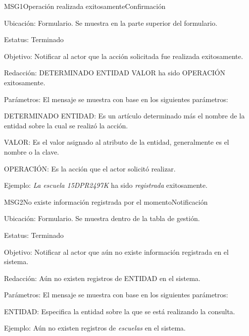 \begin{mensaje}{MSG1}{Operación realizada exitosamente}{Confirmación}
    \item[Ubicación:] Formulario. Se muestra en la parte superior del formulario.
    \item[Estatus:] Terminado
    \item[Objetivo:] Notificar al actor que la acción solicitada fue realizada exitosamente.
    \item[Redacción:] DETERMINADO ENTIDAD VALOR ha sido OPERACIÓN exitosamente.
    \item[Parámetros:] El mensaje se muestra con base en los siguientes parámetros:
    \begin{Citemize}
	\item DETERMINADO ENTIDAD: Es un artículo determinado más el nombre de la entidad sobre la cual se realizó la acción.
	\item VALOR: Es el valor asignado al atributo de la entidad, generalmente es el nombre o la clave.
	\item OPERACIÓN: Es la acción que el actor solicitó realizar.
    \end{Citemize}
    \item[Ejemplo:] {\em La escuela 15DPR2497K} ha sido {\em registrada} exitosamente.
\end{mensaje}

\begin{mensaje}{MSG2}{No existe información registrada por el momento}{Notificación}
    \item[Ubicación:] Formulario. Se muestra dentro de la tabla de gestión.
    \item[Estatus:] Terminado
    \item[Objetivo:] Notificar al actor que aún no existe información registrada en el sistema.
    \item[Redacción:] Aún no existen registros de ENTIDAD en el sistema.
    \item[Parámetros:] El mensaje se muestra con base en los siguientes parámetros:
    \begin{Citemize}
	\item ENTIDAD: Especifica la entidad sobre la que se está realizando la consulta.
    \end{Citemize}
    \item[Ejemplo:] Aún no existen registros de {\em escuelas} en el sistema.
\end{mensaje}


